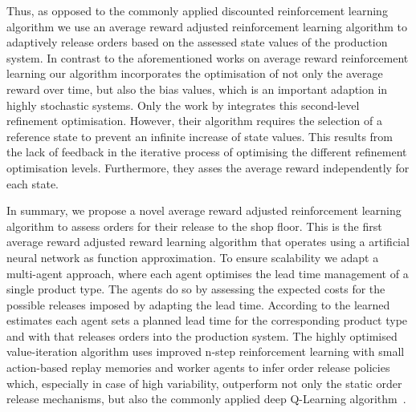 \documentclass[envcountsame]{llncs}
\newcommand\MS[2][r]{\ifx t#1 \textcolor{blue}{[\textbf{MS:} #2]}
  \else \begin{center}\textcolor{blue}{\textbf{MS:} #2} \end{center} \fi}
\begin{document}
Thus, as opposed to the commonly applied discounted reinforcement learning algorithm we use an
average reward adjusted reinforcement learning algorithm to adaptively release orders based on the
assessed state values of the production system. In contrast to the aforementioned works on average
reward reinforcement learning our algorithm incorporates the optimisation of not only the average
reward over time, but also the bias values, which is an important adaption in highly stochastic
systems. Only the work by
\citet{Mahadevan96_AnAveragerewardReinforcementLearningAlgorithmForComputingBiasoptimalPolicies}
integrates this second-level refinement optimisation. However, their algorithm requires the
selection of a reference state to prevent an infinite increase of state values. This results from
the lack of feedback in the iterative process of optimising the different refinement optimisation
levels. Furthermore, they asses the average reward independently for each state.

In summary, we propose a novel average reward adjusted reinforcement learning algorithm to assess
orders for their release to the shop floor. This is the first average reward adjusted reward
learning algorithm that operates using a artificial neural network as function approximation. To
ensure scalability we adapt a multi-agent approach, where each agent optimises the lead time
management of a single product type. The agents do so by assessing the expected costs for the
possible releases imposed by adapting the lead time. According to the learned estimates each agent
sets a planned lead time for the corresponding product type and with that releases orders into the
production system. The highly optimised value-iteration algorithm uses improved n-step reinforcement
learning with small action-based replay memories and worker agents to infer order release policies
which, especially in case of high variability, outperform not only the static order release
mechanisms, but also the commonly applied deep Q-Learning algorithm~\citep[cf.][]{mnih2015human}.

%
\end{document}

